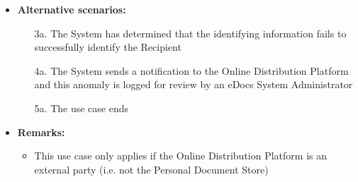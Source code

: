 \documentclass[a4paper,10pt]{article}
\begin{document}
\begin{itemize}
	\item \textbf{Alternative scenarios:} 
	\begin{enumerate}
		\item [3a.] The System has determined that the identifying information fails to successfully identify the Recipient
		\item [4a.] The System sends a notification to the Online Distribution Platform and this anomaly is logged for review by an eDocs System Administrator
		\item [5a.] The use case ends
	\end{enumerate}
	
	\item \textbf{Remarks:}
	\begin{itemize}
		\item This use case only applies if the Online Distribution Platform is an external party (i.e. not the Personal Document Store)
	\end{itemize}
\end{itemize}
\end{document}
